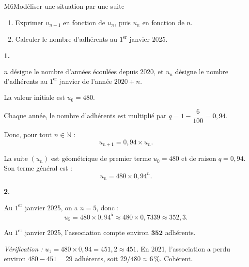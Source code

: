 \begin{fichemethode}{M6}{Modéliser une situation par une suite}
{\begin{enumerate}
  \item Exprimer $u_{n+1}$ en fonction de $u_n$, puis $u_n$ en fonction de $n$.
  \item Calculer le nombre d'adhérents au $1^{\text{er}}$ janvier 2025.
\end{enumerate}

\medskip
\textbf{1.}

$n$ désigne le nombre d'années écoulées depuis 2020, et $u_n$ désigne le nombre d'adhérents au $1^{\text{er}}$ janvier de l'année $2020 + n$.

La valeur initiale est $u_0 = 480$.

Chaque année, le nombre d'adhérents est multiplié par $q = 1 - \dfrac{6}{100} = 0{,}94$.

Donc, pour tout $n \in \mathbb{N}$ :
\[
  u_{n+1} = 0{,}94 \times u_n.
\]

La suite $(u_n)$ est géométrique de premier terme $u_0 = 480$ et de raison $q = 0{,}94$. Son terme général est :
\[
  u_n = 480 \times 0{,}94^n.
\]

\medskip
\textbf{2.}

Au $1^{\text{er}}$ janvier 2025, on a $n = 5$, donc :
\[
  u_5 = 480 \times 0{,}94^5 \approx 480 \times 0{,}7339 \approx 352{,}3.
\]

Au $1^{\text{er}}$ janvier 2025, l'association compte environ $\mathbf{352}$ adhérents.

\medskip
\textit{Vérification :} $u_1 = 480 \times 0{,}94 = 451{,}2 \approx 451$. En 2021, l'association a perdu environ $480 - 451 = 29$ adhérents, soit $29/480 \approx 6\,\%$. Cohérent.
}

\end{fichemethode}
